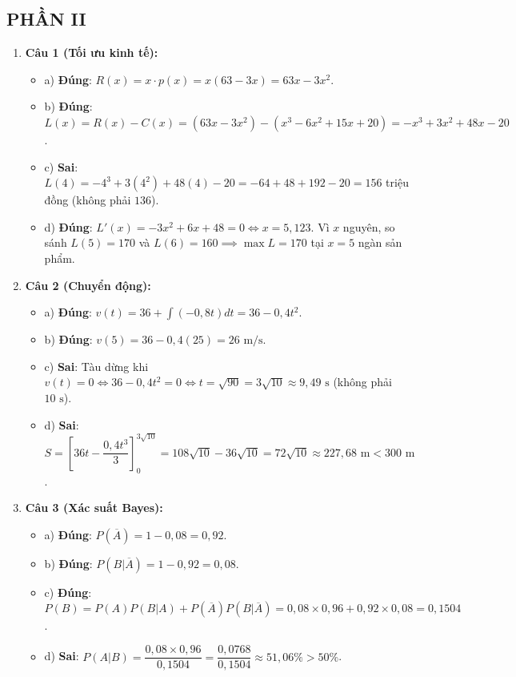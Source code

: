 \documentclass[12pt,a4paper]{article}
\begin{document}
\subsection*{PHẦN II}
\begin{enumerate}[label=\textbf{Câu \arabic*:}, leftmargin=*]
\item \textbf{Câu 1 (Tối ưu kinh tế):}
\begin{itemize}
    \item a) \textbf{Đúng}: $R(x) = x \cdot p(x) = x(63 - 3x) = 63x - 3x^2$.
    \item b) \textbf{Đúng}: $L(x) = R(x) - C(x) = (63x - 3x^2) - (x^3 - 6x^2 + 15x + 20) = -x^3 + 3x^2 + 48x - 20$.
    \item c) \textbf{Sai}: $L(4) = -4^3 + 3(4^2) + 48(4) - 20 = -64 + 48 + 192 - 20 = 156$ triệu đồng (không phải $136$).
    \item d) \textbf{Đúng}: $L'(x) = -3x^2 + 6x + 48 = 0 \iff x = 5{,}123$. Vì $x$ nguyên, so sánh $L(5) = 170$ và $L(6) = 160 \implies \max L = 170$ tại $x = 5$ ngàn sản phẩm.
\end{itemize}

\item \textbf{Câu 2 (Chuyển động):}
\begin{itemize}
    \item a) \textbf{Đúng}: $v(t) = 36 + \int (-0{,}8t) dt = 36 - 0{,}4t^2$.
    \item b) \textbf{Đúng}: $v(5) = 36 - 0{,}4(25) = 26\text{ m/s}$.
    \item c) \textbf{Sai}: Tàu dừng khi $v(t) = 0 \iff 36 - 0{,}4t^2 = 0 \iff t = \sqrt{90} = 3\sqrt{10} \approx 9{,}49\text{ s}$ (không phải $10\text{ s}$).
    \item d) \textbf{Sai}: $S = \left[36t - \dfrac{0{,}4t^3}{3}\right]_0^{3\sqrt{10}} = 108\sqrt{10} - 36\sqrt{10} = 72\sqrt{10} \approx 227{,}68\text{ m} < 300\text{ m}$.
\end{itemize}

\item \textbf{Câu 3 (Xác suất Bayes):}
\begin{itemize}
    \item a) \textbf{Đúng}: $P(\overline{A}) = 1 - 0{,}08 = 0{,}92$.
    \item b) \textbf{Đúng}: $P(B|\overline{A}) = 1 - 0{,}92 = 0{,}08$.
    \item c) \textbf{Đúng}: $P(B) = P(A)P(B|A) + P(\overline{A})P(B|\overline{A}) = 0{,}08 \times 0{,}96 + 0{,}92 \times 0{,}08 = 0{,}1504$.
    \item d) \textbf{Sai}: $P(A|B) = \dfrac{0{,}08 \times 0{,}96}{0{,}1504} = \dfrac{0{,}0768}{0{,}1504} \approx 51{,}06\% > 50\%$.
\end{itemize}


\end{enumerate}
\end{document}
